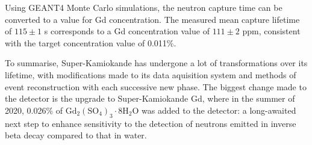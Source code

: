 Using GEANT4 Monte Carlo simulations, the neutron capture time can be converted to a value for Gd concentration. The measured mean capture lifetime of $115 \pm 1$ \micro s corresponds to a Gd concentration value of $111 \pm 2$ ppm, consistent with the target concentration value of 0.011\%.


To summarise, Super-Kamiokande has undergone a lot of transformations over its lifetime, with modifications made to its data aquisition system and methods of event reconstruction with each successive new phase. The biggest change made to the detector is the upgrade to Super-Kamiokande Gd, where in the summer of 2020, 0.026\% of $\mathrm{Gd}_{2}\left(\mathrm{SO}_{4}\right)_{3} \cdot 8 \mathrm{H}_{2} \mathrm{O}$ was added to the detector: a long-awaited next step to enhance sensitivity to the detection of neutrons emitted in inverse beta decay compared to that in water.

















